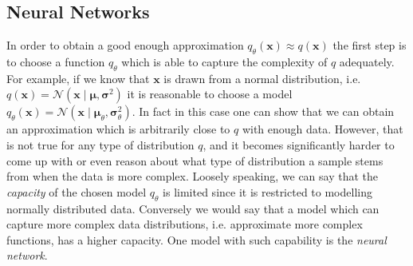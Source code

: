 \documentclass{report}
\begin{document}
\subsection{Neural Networks}

In order to obtain a good enough approximation $q_{\theta}(\bm{x}) \approx q(\bm{x})$ the first step is to choose a function $q_{\theta}$ which is able to capture the complexity of $q$ adequately. For example, if we know that $\bm{x}$ is drawn from a normal distribution, i.e. $q(\bm{x}) = \mathcal{N}(\bm{x} \mid \bm{\mu}, \bm{\sigma}^2)$ it is reasonable to choose a model $q_{\theta}(\bm{x}) = \mathcal{N}(\bm{x} \mid \bm{\mu}_{\theta}, \bm{\sigma}_{\theta}^2)$. In fact in this case one can show that we can obtain an approximation which is arbitrarily close to $q$ with enough data. However, that is not true for any type of distribution $q$, and it becomes significantly harder to come up with or even reason about what type of distribution a sample stems from when the data is more complex. Loosely speaking, we can say that the \textit{capacity} of the chosen model $q_{\theta}$ is limited since it is restricted to modelling normally distributed data. Conversely we would say that a model which can capture more complex data distributions, i.e. approximate more complex functions, has a higher capacity. One model with such capability is the \textit{neural network}.
\end{document}
